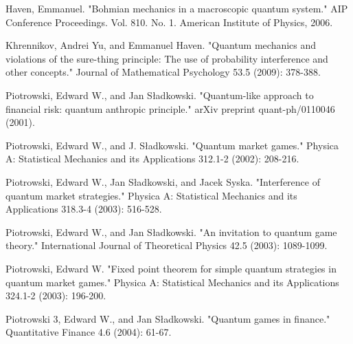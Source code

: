 \documentclass[a4paper,titlepage,12pt,fleqn,oneside]{report}
\begin{document}
\begin{thebibliography}{99}
\begin{LTRitems}
	Haven, Emmanuel. "Bohmian mechanics in a macroscopic quantum system." AIP Conference Proceedings. Vol. 810. No. 1. American Institute of Physics, 2006.
\end{LTRitems}

\begin{LTRitems}
	Khrennikov, Andrei Yu, and Emmanuel Haven. "Quantum mechanics and violations of the sure-thing principle: The use of probability interference and other concepts." Journal of Mathematical Psychology 53.5 (2009): 378-388.
\end{LTRitems}

\begin{LTRitems}
	Piotrowski, Edward W., and Jan Sładkowski. "Quantum-like approach to financial risk: quantum anthropic principle." arXiv preprint quant-ph/0110046 (2001).
\end{LTRitems}

\begin{LTRitems}
	Piotrowski, Edward W., and J. Sładkowski. "Quantum market games." Physica A: Statistical Mechanics and its Applications 312.1-2 (2002): 208-216.
\end{LTRitems}

\begin{LTRitems}
	Piotrowski, Edward W., Jan Sładkowski, and Jacek Syska. "Interference of quantum market strategies." Physica A: Statistical Mechanics and its Applications 318.3-4 (2003): 516-528.
\end{LTRitems}

\begin{LTRitems}
	Piotrowski, Edward W., and Jan Sładkowski. "An invitation to quantum game theory." International Journal of Theoretical Physics 42.5 (2003): 1089-1099.
\end{LTRitems}

\begin{LTRitems}
	Piotrowski, Edward W. "Fixed point theorem for simple quantum strategies in quantum market games." Physica A: Statistical Mechanics and its Applications 324.1-2 (2003): 196-200.
\end{LTRitems}

\begin{LTRitems}
	Piotrowski 3, Edward W., and Jan Sładkowski. "Quantum games in finance." Quantitative Finance 4.6 (2004): 61-67.
\end{LTRitems}


\end{thebibliography}
\end{document}
